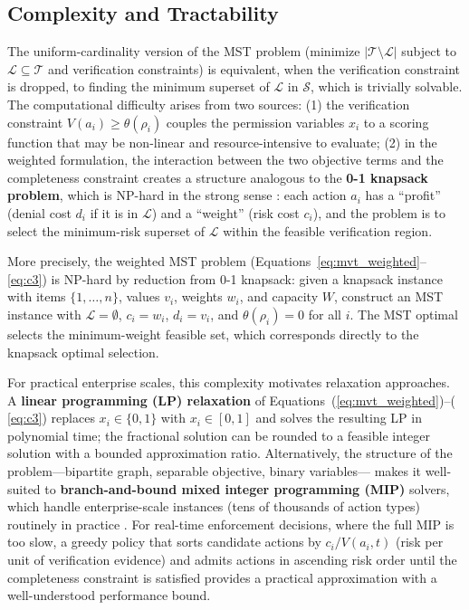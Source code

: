 \documentclass[unnumsec,webpdf,contemporary,large]{oup-authoring-template}
\theoremstyle{thmstyleone}
\theoremstyle{thmstyletwo}
\theoremstyle{thmstylethree}
\begin{document}
\begin{appendices}
\subsection{Complexity and Tractability}
\label{app:A5}

The uniform-cardinality version of the MST problem (minimize $|\mathcal{T} \setminus
\mathcal{L}|$ subject to $\mathcal{L} \subseteq \mathcal{T}$ and verification
constraints) is equivalent, when the verification constraint is dropped, to
finding the minimum superset of $\mathcal{L}$ in $\mathcal{S}$, which is trivially
solvable. The computational difficulty arises from two sources: (1) the
verification constraint $V(a_i) \geq \theta(\rho_i)$ couples the permission
variables $x_i$ to a scoring function that may be non-linear and resource-intensive
to evaluate; (2) in the weighted formulation, the interaction between the two
objective terms and the completeness constraint creates a structure analogous to the
\textbf{0-1 knapsack problem}, which is NP-hard in the strong sense
\cite{garey1979}: each action $a_i$ has a ``profit'' (denial cost $d_i$ if it is
in $\mathcal{L}$) and a ``weight'' (risk cost $c_i$), and the problem is to select
the minimum-risk superset of $\mathcal{L}$ within the feasible verification region.

More precisely, the weighted MST problem (Equations~\ref{eq:mvt_weighted}--\ref{eq:c3})
is NP-hard by reduction from 0-1 knapsack: given a knapsack instance with items
$\{1,\ldots,n\}$, values $v_i$, weights $w_i$, and capacity $W$, construct an MST
instance with $\mathcal{L} = \emptyset$, $c_i = w_i$, $d_i = v_i$, and
$\theta(\rho_i) = 0$ for all $i$. The MST optimal selects the minimum-weight
feasible set, which corresponds directly to the knapsack optimal selection.

For practical enterprise scales, this complexity motivates relaxation approaches.
A \textbf{linear programming (LP) relaxation} of Equations~(\ref{eq:mvt_weighted})--(%
\ref{eq:c3}) replaces $x_i \in \{0,1\}$ with $x_i \in [0,1]$ and solves the
resulting LP in polynomial time; the fractional solution can be rounded to a
feasible integer solution with a bounded approximation ratio. Alternatively, the
structure of the problem---bipartite graph, separable objective, binary variables---
makes it well-suited to \textbf{branch-and-bound mixed integer programming (MIP)}
solvers, which handle enterprise-scale instances (tens of thousands of action
types) routinely in practice \cite{wolsey1998}. For real-time enforcement decisions,
where the full MIP is too slow, a greedy policy that sorts candidate actions by
$c_i / V(a_i, t)$ (risk per unit of verification evidence) and admits actions in
ascending risk order until the completeness constraint is satisfied provides a
practical approximation with a well-understood performance bound.


\end{appendices}
\end{document}
